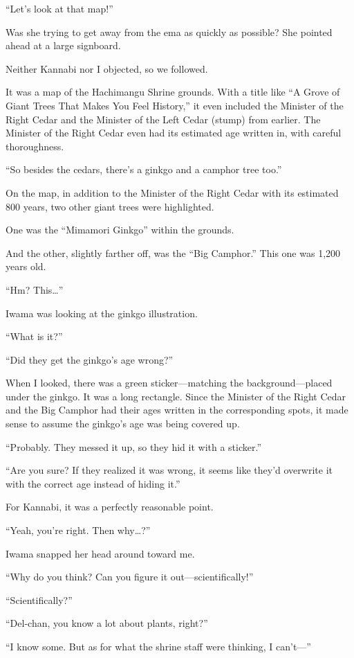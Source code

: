 \documentclass[
    a4paper,
    12pt,
    twoside,
    openany,
    UTF8,
    fontset=windows
]{ctexbook}
\begin{document}
``Let's look at that map!''

Was she trying to get away from the ema as quickly as possible? She pointed ahead at a large signboard.

Neither Kannabi nor I objected, so we followed.

It was a map of the Hachimangu Shrine grounds. With a title like ``A Grove of Giant Trees That Makes You Feel History,'' it even included the Minister of the Right Cedar and the Minister of the Left Cedar (stump) from earlier. The Minister of the Right Cedar even had its estimated age written in, with careful thoroughness.

``So besides the cedars, there's a ginkgo and a camphor tree too.''

On the map, in addition to the Minister of the Right Cedar with its estimated 800 years, two other giant trees were highlighted.

One was the ``Mimamori Ginkgo'' within the grounds.

And the other, slightly farther off, was the ``Big Camphor.'' This one was 1,200 years old.

``Hm? This\dots''

Iwama was looking at the ginkgo illustration.

``What is it?''

``Did they get the ginkgo's age wrong?''

When I looked, there was a green sticker---matching the background---placed under the ginkgo. It was a long rectangle. Since the Minister of the Right Cedar and the Big Camphor had their ages written in the corresponding spots, it made sense to assume the ginkgo's age was being covered up.

``Probably. They messed it up, so they hid it with a sticker.''

``Are you sure? If they realized it was wrong, it seems like they'd overwrite it with the correct age instead of hiding it.''

For Kannabi, it was a perfectly reasonable point.

``Yeah, you're right. Then why\dots?''

Iwama snapped her head around toward me.

``Why do you think? Can you figure it out---scientifically!''

``Scientifically?''

``Del-chan, you know a lot about plants, right?''

``I know some. But as for what the shrine staff were thinking, I can't---''
\end{document}
